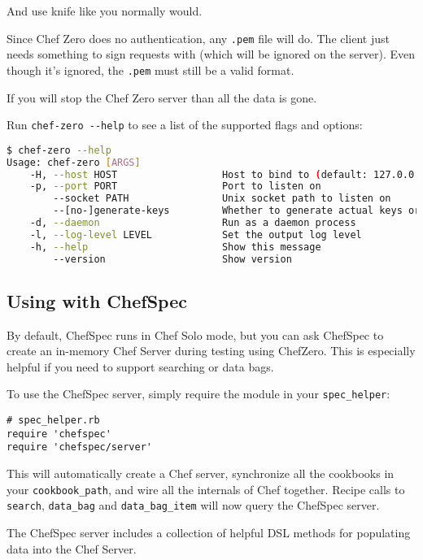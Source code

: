 And use knife like you normally would.

Since Chef Zero does no authentication, any \lstinline!.pem! file will do. The client just needs something to sign requests with (which will be ignored on the server). Even though it's ignored, the \lstinline!.pem! must still be a valid format.

If you will stop the Chef Zero server than all the data is gone.

Run \lstinline!chef-zero --help! to see a list of the supported flags and options:

\begin{lstlisting}[language=Bash,label=lst:testing-chef-zero4]
$ chef-zero --help
Usage: chef-zero [ARGS]
    -H, --host HOST                  Host to bind to (default: 127.0.0.1)
    -p, --port PORT                  Port to listen on
        --socket PATH                Unix socket path to listen on
        --[no-]generate-keys         Whether to generate actual keys or fake it (faster).  Default: false.
    -d, --daemon                     Run as a daemon process
    -l, --log-level LEVEL            Set the output log level
    -h, --help                       Show this message
        --version                    Show version
\end{lstlisting}


\subsection{Using with ChefSpec}

By default, ChefSpec runs in Chef Solo mode, but you can ask ChefSpec to create an in-memory Chef Server during testing using ChefZero. This is especially helpful if you need to support searching or data bags.

To use the ChefSpec server, simply require the module in your \lstinline!spec_helper!:

\begin{lstlisting}[label=lst:testing-chef-zero5]
# spec_helper.rb
require 'chefspec'
require 'chefspec/server'
\end{lstlisting}

This will automatically create a Chef server, synchronize all the cookbooks in your \lstinline!cookbook_path!, and wire all the internals of Chef together. Recipe calls to \lstinline!search!, \lstinline!data_bag! and \lstinline!data_bag_item! will now query the ChefSpec server.

The ChefSpec server includes a collection of helpful DSL methods for populating data into the Chef Server.

